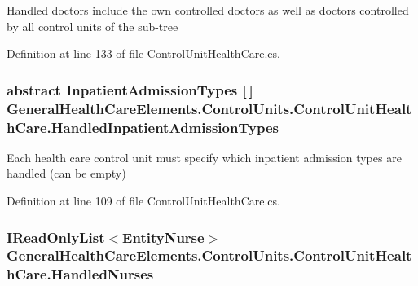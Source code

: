 Handled doctors include the own controlled doctors as well as doctors controlled by all control units of the sub-\/tree 



Definition at line 133 of file Control\+Unit\+Health\+Care.\+cs.

\subsubsection[{\texorpdfstring{Handled\+Inpatient\+Admission\+Types}{HandledInpatientAdmissionTypes}}]{\setlength{\rightskip}{0pt plus 5cm}abstract {\bf Inpatient\+Admission\+Types} \mbox{[}$\,$\mbox{]} General\+Health\+Care\+Elements.\+Control\+Units.\+Control\+Unit\+Health\+Care.\+Handled\+Inpatient\+Admission\+Types\hspace{0.3cm}{\ttfamily [get]}}\hypertarget{class_general_health_care_elements_1_1_control_units_1_1_control_unit_health_care_afda052c6b7471c7d56be7f96b38f793f}{}\label{class_general_health_care_elements_1_1_control_units_1_1_control_unit_health_care_afda052c6b7471c7d56be7f96b38f793f}


Each health care control unit must specify which inpatient admission types are handled (can be empty) 



Definition at line 109 of file Control\+Unit\+Health\+Care.\+cs.

\subsubsection[{\texorpdfstring{Handled\+Nurses}{HandledNurses}}]{\setlength{\rightskip}{0pt plus 5cm}I\+Read\+Only\+List$<${\bf Entity\+Nurse}$>$ General\+Health\+Care\+Elements.\+Control\+Units.\+Control\+Unit\+Health\+Care.\+Handled\+Nurses\hspace{0.3cm}{\ttfamily [get]}}\hypertarget{class_general_health_care_elements_1_1_control_units_1_1_control_unit_health_care_af2469a461a73ab21a9a3a7aa5472a9ee}{}\label{class_general_health_care_elements_1_1_control_units_1_1_control_unit_health_care_af2469a461a73ab21a9a3a7aa5472a9ee}


